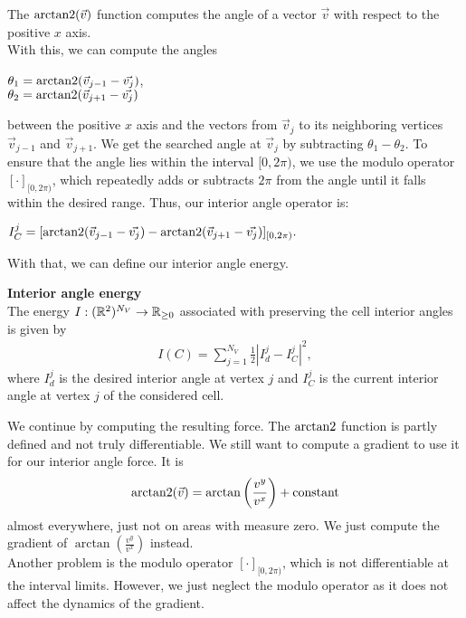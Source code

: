 The $\operatorname{arctan2}(\vec{v})$ function computes the angle of a vector $\vec{v}$ with respect to the positive $x$ axis. \\
With this, we can compute the angles 
\begin{center}
	
	$\theta_1 = \operatorname{arctan2}( \vec{v}_{j-1} - \vec{v_j} )$, \\
	$\theta_2 = \operatorname{arctan2}( \vec{v}_{j+1} - \vec{v_j} )$
	
\end{center}
between the positive $x$ axis and the vectors from $\vec{v}_j$ to its neighboring vertices $\vec{v}_{j-1}$ and $\vec{v}_{j+1}$. 
We get the searched angle at $\vec{v}_j$ by subtracting $\theta_1 - \theta_2$.
To ensure that the angle lies within the interval $[0, 2\pi)$, we use the modulo operator $[ \cdot ]_{[0,2\pi)}$, which repeatedly adds or subtracts $2\pi$ from the angle until it falls within the desired range.
Thus, our interior angle operator is: 
\begin{center}
	$
	I^j_C = [\operatorname{arctan2}(\vec{v}_{j-1} - \vec{v_j}) - \operatorname{arctan2}(\vec{v}_{j+1} - \vec{v_j})]_{[0,2\pi)}.
	$
\end{center}

With that, we can define our interior angle energy. 
\begin{definition} \textbf{Interior angle energy} \\
	The energy $I: (\mathbb{R}^2)^{N_V} \rightarrow \mathbb{R}_{\geq 0}$ associated with preserving the cell interior angles is given by
	\begin{align}
		I(C) = \sum\limits_{j=1}^{N_V} \frac{1}{2}| I^{j}_d - I^j_{C} |^2, 
	\end{align}
	where $I^{j}_d$ is the desired interior angle at vertex $j$ and $I^j_{C}$ is the current interior angle at vertex $j$ of the considered cell. 
\end{definition}


We continue by computing the resulting force. 
The $\operatorname{arctan2}$ function is partly defined and not truly differentiable. 
We still want to compute a gradient to use it for our interior angle force. 
It is $$\operatorname{arctan2}(\vec{v}) = \arctan\left(\frac{v^{y}}{v^{x}} \right) + \text{constant}$$ almost everywhere, just not on areas with measure zero. 
We just compute the gradient of $\arctan(\frac{v^{y}}{v^{x}})$ instead. \\
Another problem is the modulo operator $[ \cdot ]_{[0,2\pi)}$, which is not differentiable at the interval limits.
However, we just neglect the modulo operator as it does not affect the dynamics of the gradient.

